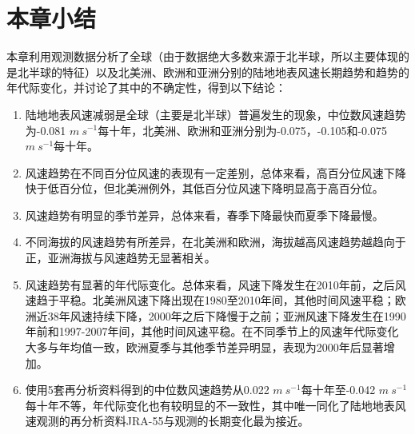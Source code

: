 \section{本章小结}

本章利用观测数据分析了全球（由于数据绝大多数来源于北半球，所以主要体现的是北半球的特征）以及北美洲、欧洲和亚洲分别的陆地地表风速长期趋势和趋势的年代际变化，并讨论了其中的不确定性，得到以下结论：

\begin{enumerate}

\item 陆地地表风速减弱是全球（主要是北半球）普遍发生的现象，中位数风速趋势为-0.081 $m ~ s^{-1}$每十年，北美洲、欧洲和亚洲分别为-0.075，-0.105和-0.075 $m ~ s^{-1}$每十年。

\item 风速趋势在不同百分位风速的表现有一定差别，总体来看，高百分位风速下降快于低百分位，但北美洲例外，其低百分位风速下降明显高于高百分位。

\item 风速趋势有明显的季节差异，总体来看，春季下降最快而夏季下降最慢。

\item 不同海拔的风速趋势有所差异，在北美洲和欧洲，海拔越高风速趋势越趋向于正，亚洲海拔与风速趋势无显著相关。

\item 风速趋势有显著的年代际变化。总体来看，风速下降发生在2010年前，之后风速趋于平稳。北美洲风速下降出现在1980至2010年间，其他时间风速平稳；欧洲近38年风速持续下降，2000年之后下降慢于之前；亚洲风速下降发生在1990年前和1997-2007年间，其他时间风速平稳。在不同季节上的风速年代际变化大多与年均值一致，欧洲夏季与其他季节差异明显，表现为2000年后显著增加。

\item 使用5套再分析资料得到的中位数风速趋势从0.022 $m ~ s^{-1}$每十年至-0.042 $m ~ s^{-1}$每十年不等，年代际变化也有较明显的不一致性，其中唯一同化了陆地地表风速观测的再分析资料JRA-55与观测的长期变化最为接近。
\end{enumerate}

